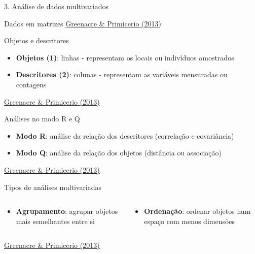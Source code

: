 \documentclass[
  ignorenonframetext,
]{beamer}
\providecommand{\tightlist}{%
  \setlength{\itemsep}{0pt}\setlength{\parskip}{0pt}}\usepackage{longtable,booktabs,array}
\begin{document}
\begin{frame}{3. Análise de dados multivariados}
\protect\hypertarget{anuxe1lise-de-dados-multivariados}{}
\begin{block}{Dados em matrizes}
\protect\hypertarget{dados-em-matrizes}{}
\href{https://www.fbbva.es/microsite/multivariate-statistics/}{Greenacre
\& Primicerio (2013)}
\end{block}

\begin{block}{Objetos e descritores}
\protect\hypertarget{objetos-e-descritores}{}
\begin{itemize}
\tightlist
\item
  \textbf{Objetos (1)}: linhas - representam os locais ou indivíduos
  amostrados
\item
  \textbf{Descritores (2)}: colunas - representam as variáveis
  mensuradas ou contagens
\end{itemize}

\href{https://www.fbbva.es/microsite/multivariate-statistics/}{Greenacre
\& Primicerio (2013)}
\end{block}

\begin{block}{Análises no modo R e Q}
\protect\hypertarget{anuxe1lises-no-modo-r-e-q}{}
\begin{itemize}
\tightlist
\item
  \textbf{Modo R}: análise da relação dos descritores (correlação e
  covariância)
\item
  \textbf{Modo Q}: análise da relação dos objetos (distância ou
  associação)
\end{itemize}

\href{https://www.fbbva.es/microsite/multivariate-statistics/}{Greenacre
\& Primicerio (2013)}
\end{block}

\begin{block}{Tipos de análises multivariadas}
\protect\hypertarget{tipos-de-anuxe1lises-multivariadas}{}
\begin{columns}[T]
\begin{column}{0.5\textwidth}
\begin{itemize}
\tightlist
\item
  \textbf{Agrupamento}: agrupar objetos mais semelhantes entre si
\end{itemize}
\end{column}

\begin{column}{0.5\textwidth}
\begin{itemize}
\item
  \textbf{Ordenação}: ordenar objetos num espaço com menos dimensões
\end{itemize}
\end{column}
\end{columns}

\href{https://www.fbbva.es/microsite/multivariate-statistics/}{Greenacre
\& Primicerio (2013)}
\end{block}
\end{frame}
\end{document}
